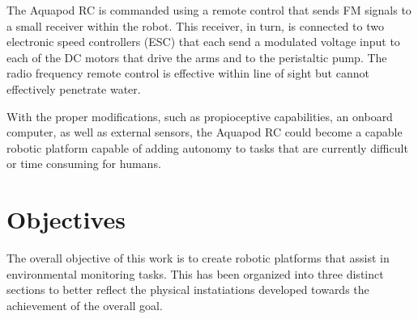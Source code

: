		The Aquapod RC is commanded using a remote control that sends FM signals to a small receiver within the robot. This receiver, in turn, is connected to two electronic speed controllers (ESC) that each send a modulated voltage input to each of the DC motors that drive the arms and to the peristaltic pump. The radio frequency remote control is effective within line of sight but cannot effectively penetrate water. 

		With the proper modifications, such as propioceptive capabilities, an onboard computer, as well as external sensors, the Aquapod RC could become a capable robotic platform capable of adding autonomy to tasks that are currently difficult or time consuming for humans. 






\section{Objectives}

The overall objective of this work is to create robotic platforms that assist in environmental monitoring tasks. This has been organized into three distinct sections to better reflect the physical instatiations developed towards the achievement of the overall goal. 




